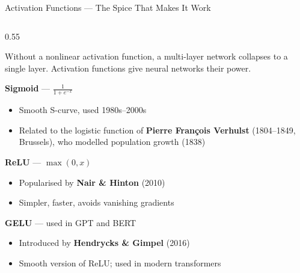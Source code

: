 \begin{frame}[shrink=25]{Activation Functions --- The Spice That Makes It Work}

  \begin{columns}[T]
    \begin{column}{0.55\textwidth}
      \begin{insightbox}
        Without a nonlinear activation function, a multi-layer network
        collapses to a single layer. Activation functions give neural
        networks their power.
      \end{insightbox}

      \vspace{0.2em}
      {\small
      \textbf{Sigmoid} --- $\displaystyle\frac{1}{1+e^{-x}}$\par
      \begin{itemize}\setlength\itemsep{1pt}
        \item Smooth S-curve, used 1980s--2000s
        \item Related to the logistic function of
              \textbf{Pierre Fran\c{c}ois Verhulst} (1804--1849,
              Brussels), who modelled population growth (1838)
      \end{itemize}

      \textbf{ReLU} --- $\max(0, x)$\par
      \begin{itemize}\setlength\itemsep{1pt}
        \item Popularised by \textbf{Nair \& Hinton} (2010)
        \item Simpler, faster, avoids vanishing gradients
      \end{itemize}

      \textbf{GELU} --- used in GPT and BERT\par
      \begin{itemize}\setlength\itemsep{1pt}
        \item Introduced by \textbf{Hendrycks \& Gimpel} (2016)
        \item Smooth version of ReLU; used in modern transformers
      \end{itemize}
      }
    \end{column}


\end{columns}
\end{frame}

